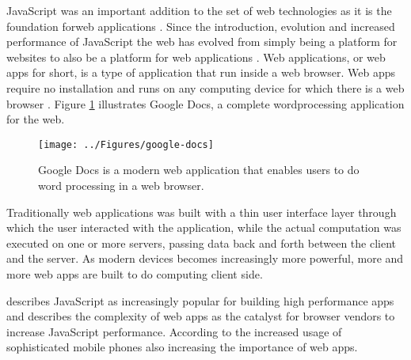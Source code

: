 JavaScript was an important addition to the set of web technologies as it is the foundation forweb applications \parencite{ParkJungMoon2015}. Since the introduction, evolution and increased performance of JavaScript the web has evolved from simply being a platform for websites to also be a platform for web applications \parencite{SandhuHerreraHendren2018}. Web applications, or web apps for short, is a type of application that run inside a web browser. Web apps require no installation and runs on any computing device for which there is a web browser \parencite{RatanaworabhanLivshitsZorn2010}. Figure \ref{google-docs} illustrates Google Docs, a complete wordprocessing application for the web.

\begin{figure}[!h]
\centering
\texttt{[image: ../Figures/google-docs]}
\caption{Google Docs is a modern web application that enables users to do word processing in a web browser.}
\label{google-docs}
\end{figure}





Traditionally web applications was built with a thin user interface layer through which the user interacted with the application, while the actual computation was executed on one or more servers, %
passing data back and forth between the client and the server. As modern devices becomes increasingly more powerful, more and more web apps are built to do computing client side.


\textcite{SandhuHerreraHendren2018} describes JavaScript as increasingly popular for building high performance apps and \textcite{RatanaworabhanLivshitsZorn2010} describes the complexity of web apps as the catalyst for browser vendors to increase JavaScript performance. According to \textcite{RatanaworabhanLivshitsZorn2010} the increased usage of sophisticated mobile phones also increasing the importance of web apps.
